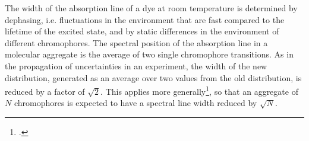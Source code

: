 The width of the absorption line of a dye at room temperature is determined by dephasing, i.e. fluctuations in the environment that are fast compared to the lifetime of the excited state, and by static differences in the environment of different chromophores. The spectral position of the absorption line in a molecular aggregate is the average of two single chromophore transitions. As in the propagation of uncertainties in an experiment, the width of the new distribution, generated as an average over two values from the old distribution, is reduced by a factor of $\sqrt{2}$. This applies more generally\footcite{Knapp1984}, so that an aggregate of $N$ chromophores is expected to have a spectral line width reduced by $\sqrt{N}$.








\printbibliography[segment=\therefsegment,heading=subbibliography]
